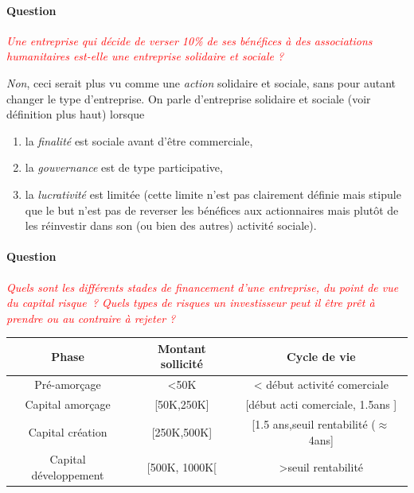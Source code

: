 \documentclass[12pt,oneside,a4paper]{article}
\newcommand{\question}[1]
{
\addtocounter{section}{1}
\paragraph*{Question \thesection}
\emph{\textcolor{red}{#1}}
}
\begin{document}
\question{Une entreprise qui décide de verser 10\% de ses bénéfices à des associations
humanitaires est-elle une entreprise solidaire et sociale ?}
\emph{Non}, ceci serait plus vu comme une \emph{action} solidaire et sociale,
sans pour autant changer le type d'entreprise.
On parle d'entreprise solidaire et sociale (voir définition plus haut)
lorsque 
\begin{enumerate}
  \item la \emph{finalité} est sociale avant d'être commerciale,
  \item la \emph{gouvernance} est de type participative,
  \item la \emph{lucrativité} est limitée (cette limite n'est pas clairement définie
  mais stipule que le but n'est pas de reverser les bénéfices aux actionnaires
  mais plutôt de les réinvestir dans son (ou bien des autres) activité sociale).
\end{enumerate}
 
\question{Quels sont les différents stades de financement d’une entreprise, du point de vue du capital risque ? Quels types de risques un investisseur peut il être prêt à prendre ou au contraire à rejeter ?}


\vspace{1cm}
\begin{tabular}{|c|c|c|} 
	\hline
	 Phase & Montant sollicité & Cycle de vie\\
	 \hline
	 Pré-amorçage & <50K & < début activité comerciale\\
	 \hline
	 Capital amorçage & [50K,250K] & [début acti comerciale, 1.5ans ]\\
	 \hline
	 Capital création & [250K,500K] & [1.5 ans,seuil rentabilité ($\approx$4ans]\\
	 \hline
	 Capital développement & [500K, 1000K[ & >seuil rentabilité\\
	 \hline
\end{tabular} 
\vspace{1cm}

\end{document}
